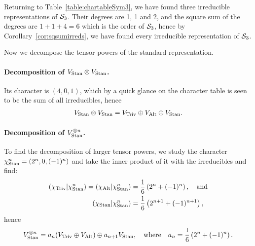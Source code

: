 \begin{example}
	Returning to Table~\ref{table:chartableSym3}, we have found three irreducible representations of $\mathcal{S}_3$. Their degrees are 1, 1 and 2, and the square sum of the degrees are $1 + 1 + 4 = 6$ which is the order of $\mathcal{S}_3$, hence by Corollary~\ref{cor:sqsumirreds}, we have found every irreducible representation of $\mathcal{S}_3$. 
	
	Now we decompose the tensor powers of the standard representation.
	
	\paragraph{Decomposition of $V_{\text{Stan}} \otimes V_{\text{Stan}}$.} Its character is $(4,0,1)$, which by a quick glance on the character table is seen to be the sum of all irreducibles, hence \begin{align*}
		V_{\text{Stan}} \otimes V_{\text{Stan}} = V_{\text{Triv}} \oplus V_{\text{Alt}} \oplus V_{\text{Stan}}.
	\end{align*}
	
%	
	
	\paragraph{Decomposition of $V_{\text{Stan}}^{\otimes n}$.}\cite[Exercise 2.7.]{FultonHarris} To find the decomposition of larger tensor powers, we study the character $\chi_{\text{Stan}}^n = (2^n, 0, (-1)^n)$ and take the inner product of it with the irreducibles and find:
	\begin{align*}
		({\chi_{\text{Triv}}}|\chi_{\text{Stan}}^n) = ({\chi_{\text{Alt}}}|\chi_{\text{Stan}}^n) &= \frac{1}{6}\left(2^n + (-1)^n\right), \quad \text{and}\\
		({\chi_{\text{Stan}}}|\chi_{\text{Stan}}^n) &= \frac{1}{6}\left(2^{n+1} + (-1)^{n+1}\right), 
	\end{align*}
	hence \begin{align*}
		V_{\text{Stan}}^{\otimes n} = a_n (V_{\text{Triv}} \oplus V_{\text{Alt}}) \oplus a_{n+1} V_{\text{Stan}}, \quad \text{where} \quad a_n = \frac{1}{6}\left(2^n + (-1)^n\right).
	\end{align*} 
\end{example}

